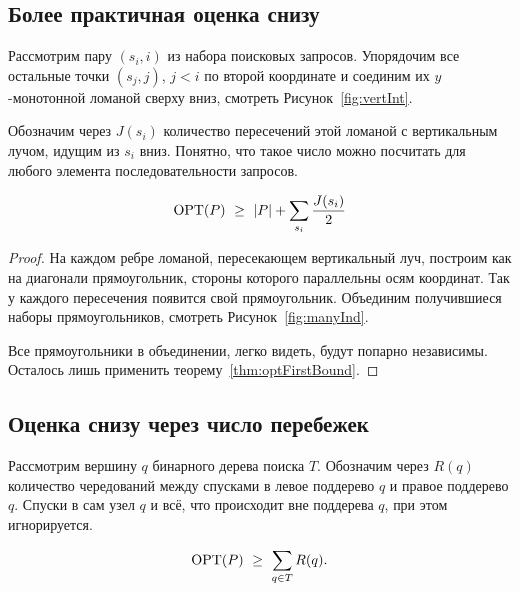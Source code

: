 \subsection{Более практичная оценка снизу}

Рассмотрим пару $(s_i,i)$ из набора поисковых запросов. Упорядочим все остальные точки $(s_j,j)$, $j < i$ по второй координате и соединим их $y$-монотонной ломаной сверху вниз, смотреть Рисунок~\ref{fig:vertInt}.



Обозначим через $J(s_i)$ количество пересечений этой ломаной с вертикальным лучом, идущим из $s_i$ вниз. Понятно, что такое число можно посчитать для любого элемента последовательности запросов.

\begin{theorem} \label{thm:optIndBound}
\begin{equation} \label{eq:optIndBound}
	\operatorname{OPT}(P)\ \ge\ |P| + \sum\limits_{s_i} \frac{J(s_i)}{2}
\end{equation}
\end{theorem}

\begin{proof}
На каждом ребре ломаной, пересекающем вертикальный луч, построим как на диагонали прямоугольник, стороны которого параллельны осям координат. Так у каждого пересечения появится свой прямоугольник. Объединим получившиеся наборы прямоугольников, смотреть Рисунок~\ref{fig:manyInd}.



Все прямоугольники в объединении, легко видеть, будут попарно независимы. Осталось лишь применить теорему~\ref{thm:optFirstBound}.
\end{proof}

\subsection{Оценка снизу через число перебежек}

Рассмотрим вершину $q$ бинарного дерева поиска $T$. Обозначим через $R(q)$ количество чередований между спусками в левое поддерево $q$ и правое поддерево $q$. Спуски в сам узел $q$ и всё, что происходит вне поддерева $q$, при этом игнорируется.

\begin{theorem} \label{thm:optPereBound}
\begin{equation} \label{eq:optPereBound}
	\operatorname{OPT}(P)\ \ge\ \sum\limits_{q \in T} R(q).
\end{equation}
\end{theorem}

